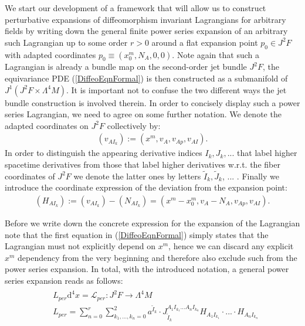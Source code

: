 We start our development of a framework that will allow us to construct perturbative expansions of diffeomorphism invariant Lagrangians for arbitrary fields by writing down the general finite power series expansion of an arbitrary such Lagrangian up to some order $r > 0$ around a flat expansion point $p_0 \in J^2F$ with adapted coordinates $p_0 \equiv (x_0^m,N_A, 0, 0)$. Note again that such a Lagrangian is already a bundle map on the second-order jet bundle $J^2F$, the equivariance PDE (\ref{DiffeoEqnFormal}) is then constructed as a submanifold of $J^1(J^2F \times \Lambda^4M)$. It is important not to confuse the two different ways the jet bundle construction is involved therein. In order to concisely display such a power series Lagrangian, we need to agree on some further notation. We denote the adapted coordinates on $J^2F$ collectively by:
\begin{align}
    (v_{AI_k}) := (x^m,v_A,v_{Ap},v_{AI}).
\end{align}
In order to distinguish the appearing derivative indices $I_k,J_k,...$ that label higher spacetime derivatives from those that label higher derivatives w.r.t. the fiber coordinates of $J^2F$ we denote the latter ones by letters
$\tilde{I}_k, \tilde{J}_k$, ... . Finally we introduce the coordinate expression of the deviation from the expansion point: 
\begin{align}
    (H_{AI_k}) := (v_{AI_k}) - (N_{AI_k}) = (x^m-x_0^m,v_A-N_A,v_{Ap},v_{AI}).
\end{align}

Before we write down the concrete expression for the expansion of the Lagrangian note that the first equation in (\ref{DiffeoEqnFormal}) simply states that the Lagrangian must not explicitly depend on $x^m$, hence we can discard any explicit $x^m$ dependency from the very beginning and therefore also exclude such from the power series expansion. In total, with the introduced notation, a general power series expansion reads as follows: 
\begin{align} \label{generalPowerSL}
    \begin{aligned}
    &L_{per}  \mathrm{d}^4x = \mathcal{L}_{per} : J^2F \longrightarrow \Lambda^4M \\
    &L_{per} = \sum_{n=0}^r \sum_{k_1,...,k_n = 0}^2 a^{\tilde{I}_k} \cdot J_{\tilde{I}_k}^{A_1I_{k_1}...A_nI_{k_n}} H_{A_1I_{k_1}} \cdot ... \cdot H_{A_nI_{k_n}}
    \end{aligned}
\end{align}

